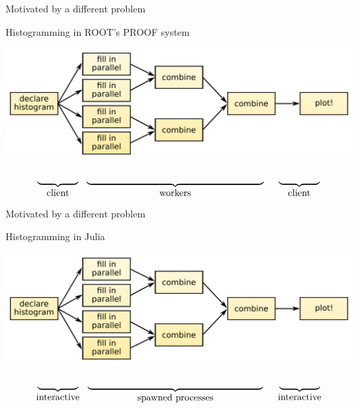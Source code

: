 \documentclass{beamer}
\begin{document}
\begin{frame}{Motivated by a different problem}

\begin{block}{Histogramming in ROOT's PROOF system}
\end{block}

\includegraphics[width=\linewidth]{parallelization.pdf}

\vspace{-1 cm}
\[ \underbrace{\mbox{\hspace{1.5 cm}}}_{\mbox{client}} \hspace{0.25 cm} \underbrace{\mbox{\hspace{6.5 cm}}}_{\mbox{workers}} \hspace{0.5 cm} \underbrace{\mbox{\hspace{1.5 cm}}}_{\mbox{client}} \]

\end{frame}

\begin{frame}{Motivated by a different problem}

\begin{block}{Histogramming in Julia}
\end{block}

\includegraphics[width=\linewidth]{parallelization.pdf}

\vspace{-1 cm}
\[ \underbrace{\mbox{\hspace{1.5 cm}}}_{\mbox{interactive}} \hspace{0.25 cm} \underbrace{\mbox{\hspace{6.5 cm}}}_{\mbox{spawned processes}} \hspace{0.5 cm} \underbrace{\mbox{\hspace{1.5 cm}}}_{\mbox{interactive}} \]

\end{frame}
\end{document}
